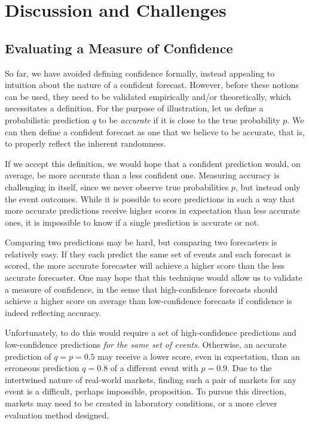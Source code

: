 \documentclass[sigconf,anonymous]{aamas}   %
\begin{document}

\section{Discussion and Challenges}
\label{sec:discussion}

\subsection{Evaluating a Measure of Confidence}
\label{sec:evaluation}

So far, we have avoided defining confidence formally, instead appealing to intuition about the nature of a confident forecast. However, before these notions can be used, they need to be validated empirically and/or theoretically, which necessitates a definition. For the purpose of illustration, let us define a probabilistic prediction $q$ to be \emph{accurate} if it is close to the true probability $p$. We can then define a confident forecast as one that we believe to be accurate, that is, to properly reflect the inherent randomness.

If we accept this definition, we would hope that a confident prediction would, on average, be more accurate than a less confident 
one. Measuring accuracy is challenging in itself, since we never observe true probabilities $p$, but instead only the event outcomes. While it is possible to score predictions in such a way that more accurate predictions receive higher scores in expectation than less accurate ones, it is impossible to know if a single prediction is accurate or not.

Comparing two predictions may be hard, but comparing two forecasters is relatively easy. If they each predict the same set of events and each forecast is scored, the more accurate forecaster will achieve a higher score than the less accurate forecaster. One may hope that this technique would allow us to validate a measure of confidence, in the sense that high-confidence forecasts should achieve a higher score on average than low-confidence forecasts if confidence is indeed reflecting accuracy.

Unfortunately, to do this would require a set of high-confidence predictions and low-confidence predictions \emph{for the same set of events}. Otherwise, an accurate prediction of $q=p=0.5$ may receive a lower score, even in expectation, than an erroneous prediction $q=0.8$ of a different event with $p=0.9$. Due to the intertwined nature of real-world markets, finding such a pair of markets for any event is a difficult, perhaps impossible, proposition. To pursue this direction, markets may need to be created in laboratory conditions, or a more clever evaluation method designed.
\end{document}
